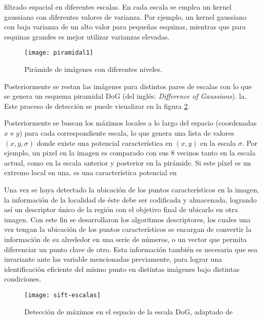 filtrado espacial en diferentes escalas. En cada escala se emplea un kernel  gaussiano con diferentes valores de varianza. Por ejemplo, un kernel gaussiano con baja varianza de un alto valor para pequeñas esquinas, mientras que para esquinas grandes es mejor utilizar varianzas elevadas. 


\begin{figure}[H]
	\centering
	\texttt{[image: piramidal1]}
	\caption[Pirámide de imágenes con diferentes niveles]{Pirámide de imágenes con diferentes niveles.}
	\label{imagen:piramidal}
\end{figure}

Posteriormente se restan las imágenes para distintos pares de escalas con lo que se genera un esquema piramidal DoG (del inglés: \textit{Difference of Gaussians}). la. Este proceso de detección se puede visualizar en la figura \ref{imagen:sift-escalas}.

Posteriormente se buscan los máximos locales a lo largo del espacio (coordenadas $x$ e $y$) para cada correspondiente escala, lo que genera una lista de valores $(x, y, \sigma)$ donde existe una potencial característica en $(x, y)$ en la escala $\sigma$. Por ejemplo, un pixel en la imagen es comparado con sus 8 vecinos tanto en la escala actual, como en la escala anterior y posterior en la pirámide. Si este píxel es un extremo local en una, es una característica potencial en 


Una vez se haya detectado la ubicación de los puntos característicos en la imagen, la información de la localidad de éste debe ser codificada y almacenada, logrando así un descriptor único de la región con el objetivo final de ubicarlo en otra imagen. Con este fin se desarrollaron los algoritmos descriptores, los cuales una vez tengan la ubicación de los puntos característicos se encargan de convertir la información de su alrededor en una serie de números, o un vector que permita diferenciar un punto clave de otro. Esta información también es necesaria que sea invariante ante las variable mencionadas previamente, para lograr una identificación eficiente del mismo punto en distintas imágenes bajo distintas condiciones.



\begin{figure}[H]
	\centering
	\texttt{[image: sift-escalas]}
	\caption[Detector SIFT]{Detección de máximos en el espacio de la escala DoG, adaptado de \cite{sift}}
	\label{imagen:sift-escalas}
\end{figure}

